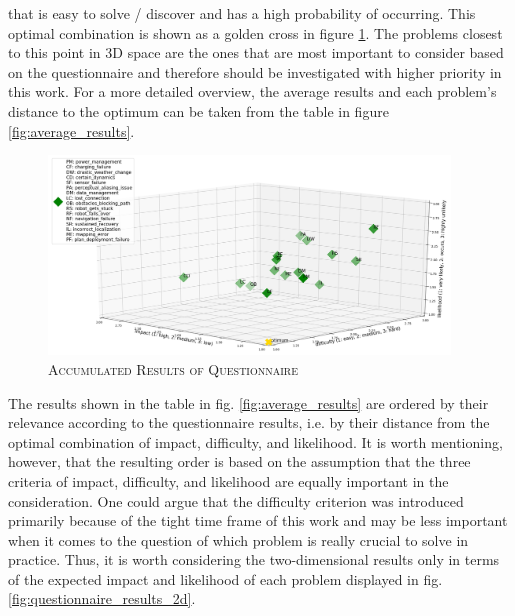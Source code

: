 \documentclass[english, master, utf8]{base/thesis_KBS}
\begin{document}
that is easy to solve / discover and has a high probability of occurring. This optimal combination is shown as a golden cross in figure \ref{fig:questionnaire_results}.
The problems closest to this point in 3D space are the ones that are most important to consider based on the questionnaire and therefore should be 
investigated with higher priority in this work. For a more detailed overview, the average results and each problem's distance to the optimum can be taken from the table 
in figure \ref{fig:average_results}.
\begin{figure}[H]
    \centering
    \includegraphics[width=0.95\textwidth]{pics/questionnaire.png}
    \caption{\textsc{Accumulated Results of Questionnaire}}
    \label{fig:questionnaire_results}
\end{figure}
\noindent
The results shown in the table in fig. \ref{fig:average_results} are ordered by their relevance according to the questionnaire results, i.e.
by their distance from the optimal combination of impact, difficulty, and likelihood. It is worth mentioning, however, that the resulting order is based on the assumption
that the three criteria of impact, difficulty, and likelihood are equally important in the consideration. One could argue that the difficulty criterion was introduced 
primarily because of the tight time frame of this work and may be less important when it comes to the question of which problem is really crucial to solve in practice.
Thus, it is worth considering the two-dimensional results only in terms of the expected impact and likelihood of each problem displayed in fig. \ref{fig:questionnaire_results_2d}.
\end{document}
